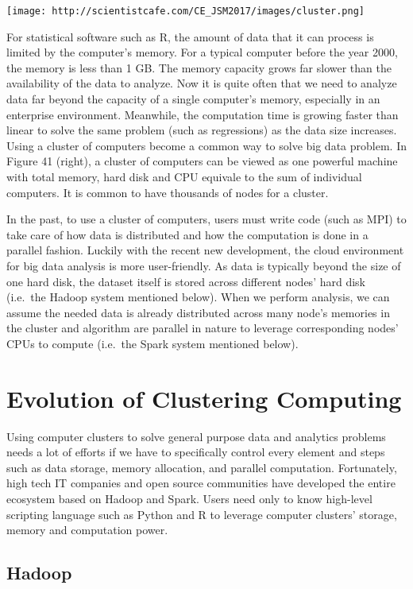 \documentclass[]{book}
\theoremstyle{definition}
\theoremstyle{definition}
\theoremstyle{remark}
\begin{document}
\texttt{[image: http://scientistcafe.com/CE\_JSM2017/images/cluster.png]}

For statistical software such as R, the amount of data that it can
process is limited by the computer's memory. For a typical computer
before the year 2000, the memory is less than 1 GB. The memory capacity
grows far slower than the availability of the data to analyze. Now it is
quite often that we need to analyze data far beyond the capacity of a
single computer's memory, especially in an enterprise environment.
Meanwhile, the computation time is growing faster than linear to solve
the same problem (such as regressions) as the data size increases. Using
a cluster of computers become a common way to solve big data problem. In
Figure 41 (right), a cluster of computers can be viewed as one powerful
machine with total memory, hard disk and CPU equivale to the sum of
individual computers. It is common to have thousands of nodes for a
cluster.

In the past, to use a cluster of computers, users must write code (such
as MPI) to take care of how data is distributed and how the computation
is done in a parallel fashion. Luckily with the recent new development,
the cloud environment for big data analysis is more user-friendly. As
data is typically beyond the size of one hard disk, the dataset itself
is stored across different nodes' hard disk (i.e.~the Hadoop system
mentioned below). When we perform analysis, we can assume the needed
data is already distributed across many node's memories in the cluster
and algorithm are parallel in nature to leverage corresponding nodes'
CPUs to compute (i.e.~the Spark system mentioned below).

\section{Evolution of Clustering
Computing}\label{evolution-of-clustering-computing}

Using computer clusters to solve general purpose data and analytics
problems needs a lot of efforts if we have to specifically control every
element and steps such as data storage, memory allocation, and parallel
computation. Fortunately, high tech IT companies and open source
communities have developed the entire ecosystem based on Hadoop and
Spark. Users need only to know high-level scripting language such as
Python and R to leverage computer clusters' storage, memory and
computation power.

\subsection{Hadoop}\label{hadoop}
\end{document}
